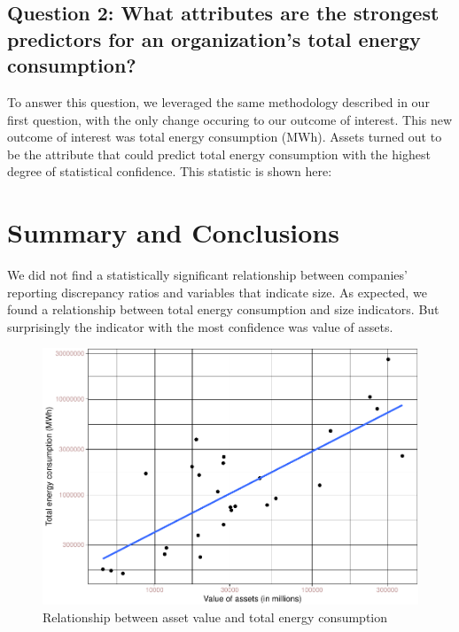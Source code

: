 \documentclass[
  12pt,
]{article}
\begin{document}
\hypertarget{question-2-what-attributes-are-the-strongest-predictors-for-an-organizations-total-energy-consumption}{%
\subsection{Question 2: What attributes are the strongest predictors for
an organization's total energy
consumption?}\label{question-2-what-attributes-are-the-strongest-predictors-for-an-organizations-total-energy-consumption}}

To answer this question, we leveraged the same methodology described in
our first question, with the only change occuring to our outcome of
interest. This new outcome of interest was total energy consumption
(MWh). Assets turned out to be the attribute that could predict total
energy consumption with the highest degree of statistical confidence.
This statistic is shown here:

\newpage

\hypertarget{summary-and-conclusions}{%
\section{Summary and Conclusions}\label{summary-and-conclusions}}

We did not find a statistically significant relationship between
companies' reporting discrepancy ratios and variables that indicate
size. As expected, we found a relationship between total energy
consumption and size indicators. But surprisingly the indicator with the
most confidence was value of assets.

\begin{figure}
\centering
\includegraphics{BoothProphete_Report_files/figure-latex/plot1-1.pdf}
\caption{Relationship between asset value and total energy consumption}
\end{figure}
\end{document}
